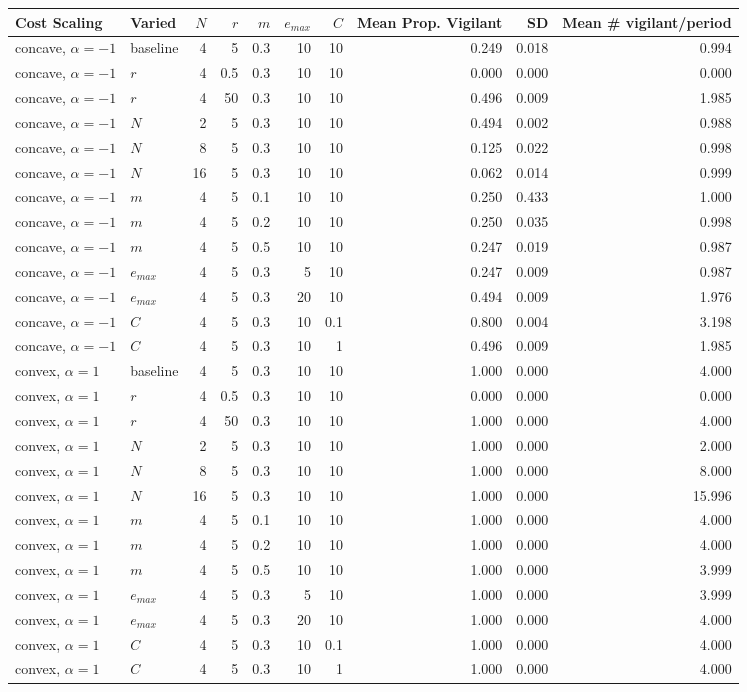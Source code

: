 \begin{tabular}{ll|rrrrr|rrr}
\toprule
Cost Scaling & Varied & $N$ & $r$ & $m$ & $e_{max}$ & $C$ & Mean Prop. Vigilant & SD & Mean \# vigilant/period \\
\midrule
concave, $\alpha=-1$ & baseline & 4 & 5 & 0.3 & 10 & 10 & 0.249 & 0.018 & 0.994 \\
concave, $\alpha=-1$ & $r$ & 4 & 0.5 & 0.3 & 10 & 10 & 0.000 & 0.000 & 0.000 \\
concave, $\alpha=-1$ & $r$ & 4 & 50 & 0.3 & 10 & 10 & 0.496 & 0.009 & 1.985 \\
concave, $\alpha=-1$ & $N$ & 2 & 5 & 0.3 & 10 & 10 & 0.494 & 0.002 & 0.988 \\
concave, $\alpha=-1$ & $N$ & 8 & 5 & 0.3 & 10 & 10 & 0.125 & 0.022 & 0.998 \\
concave, $\alpha=-1$ & $N$ & 16 & 5 & 0.3 & 10 & 10 & 0.062 & 0.014 & 0.999 \\
concave, $\alpha=-1$ & $m$ & 4 & 5 & 0.1 & 10 & 10 & 0.250 & 0.433 & 1.000 \\
concave, $\alpha=-1$ & $m$ & 4 & 5 & 0.2 & 10 & 10 & 0.250 & 0.035 & 0.998 \\
concave, $\alpha=-1$ & $m$ & 4 & 5 & 0.5 & 10 & 10 & 0.247 & 0.019 & 0.987 \\
concave, $\alpha=-1$ & $e_{max}$ & 4 & 5 & 0.3 & 5 & 10 & 0.247 & 0.009 & 0.987 \\
concave, $\alpha=-1$ & $e_{max}$ & 4 & 5 & 0.3 & 20 & 10 & 0.494 & 0.009 & 1.976 \\
concave, $\alpha=-1$ & $C$ & 4 & 5 & 0.3 & 10 & 0.1 & 0.800 & 0.004 & 3.198 \\
concave, $\alpha=-1$ & $C$ & 4 & 5 & 0.3 & 10 & 1 & 0.496 & 0.009 & 1.985 \\
\midrule
convex, $\alpha=1$ & baseline & 4 & 5 & 0.3 & 10 & 10 & 1.000 & 0.000 & 4.000 \\
convex, $\alpha=1$ & $r$ & 4 & 0.5 & 0.3 & 10 & 10 & 0.000 & 0.000 & 0.000 \\
convex, $\alpha=1$ & $r$ & 4 & 50 & 0.3 & 10 & 10 & 1.000 & 0.000 & 4.000 \\
convex, $\alpha=1$ & $N$ & 2 & 5 & 0.3 & 10 & 10 & 1.000 & 0.000 & 2.000 \\
convex, $\alpha=1$ & $N$ & 8 & 5 & 0.3 & 10 & 10 & 1.000 & 0.000 & 8.000 \\
convex, $\alpha=1$ & $N$ & 16 & 5 & 0.3 & 10 & 10 & 1.000 & 0.000 & 15.996 \\
convex, $\alpha=1$ & $m$ & 4 & 5 & 0.1 & 10 & 10 & 1.000 & 0.000 & 4.000 \\
convex, $\alpha=1$ & $m$ & 4 & 5 & 0.2 & 10 & 10 & 1.000 & 0.000 & 4.000 \\
convex, $\alpha=1$ & $m$ & 4 & 5 & 0.5 & 10 & 10 & 1.000 & 0.000 & 3.999 \\
convex, $\alpha=1$ & $e_{max}$ & 4 & 5 & 0.3 & 5 & 10 & 1.000 & 0.000 & 3.999 \\
convex, $\alpha=1$ & $e_{max}$ & 4 & 5 & 0.3 & 20 & 10 & 1.000 & 0.000 & 4.000 \\
convex, $\alpha=1$ & $C$ & 4 & 5 & 0.3 & 10 & 0.1 & 1.000 & 0.000 & 4.000 \\
convex, $\alpha=1$ & $C$ & 4 & 5 & 0.3 & 10 & 1 & 1.000 & 0.000 & 4.000 \\
\bottomrule
\end{tabular}